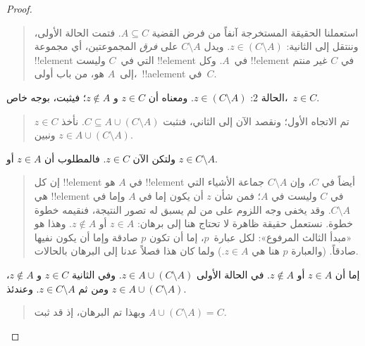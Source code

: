 \documentclass[../../../include/open-logic-section]{subfiles}
\begin{document}
\begin{proof}
\begin{quote}
    استعملنا الحقيقة المستخرجة آنفاً من فرض القضية
    $A \subseteq C$. فتمت الحالة الأولى، وننتقل إلى الثانية:
    $z \in (C \setminus A)$. ويدل $C \setminus A$ على \emph{فرق}
    المجموعتين، أي مجموعة !!{element} التي في~$C$ وليست
    !!{element} في~$A$. وكل !!{element} في $C$ غير منتم إلى~$A$ هو،
    من باب أولى،~!!a{element} في~$C$.
  \end{quote}
  الحالة 2: $z \in (C \setminus A)$. ومعناه أن $z \in C$ و
  $z \notin A$؛ فيثبت، بوجه خاص،~$z \in C$.
  \begin{quote}
    تم الاتجاه الأول؛ ونقصد الآن إلى الثاني، فنثبت
    $C \subseteq A \cup (C \setminus A)$. نأخذ $z \in C$ ونبين
    $z \in A \cup (C \setminus A)$.
  \end{quote}
  ولتكن الآن $z \in C$. فالمطلوب أن $z \in A$ أو
  $z \in C \setminus A$.
  \begin{quote}
    إن كل !!{element} في $A$ هو !!{element} أيضاً في $C$، وإن
    $C \setminus A$ جماعة الأشياء التي هي !!{element} في $C$ وليست
    في $A$؛ فمن شأن $z$ أن يكون إما في $A$ وإما في
    $C \setminus A$. وقد يخفى وجه اللزوم على من لم يسبق له تصور
    النتيجة، فنقيمه خطوة خطوة. نستعمل حقيقة ظاهرة لا تحتاج هنا إلى
    برهان: $z \in A$ أو $z \notin A$. وهذا هو «مبدأ الثالث المرفوع»:
    لكل عبارة~$p$، إما أن تكون $p$ صادقة وإما أن يكون نفيها صادقاً.
    (والعبارة $p$ هنا هي $z \in A$.) ولما كان هذا فصلاً عدنا إلى
    البرهان بالحالات.
  \end{quote}
  إما أن $z \in A$ أو $z \notin A$. في الحالة الأولى
  $z \in A \cup (C \setminus A)$. وفي الثانية $z \in C$ و
  $z \notin A$، ومن ثم $z \in C \setminus A$. وعندئذ
  $z \in A \cup (C \setminus A)$.
  \begin{quote}
    وبهذا تم البرهان، إذ قد ثبت $A \cup (C \setminus A) = C$.
  \end{quote}
\end{proof}
\end{document}

